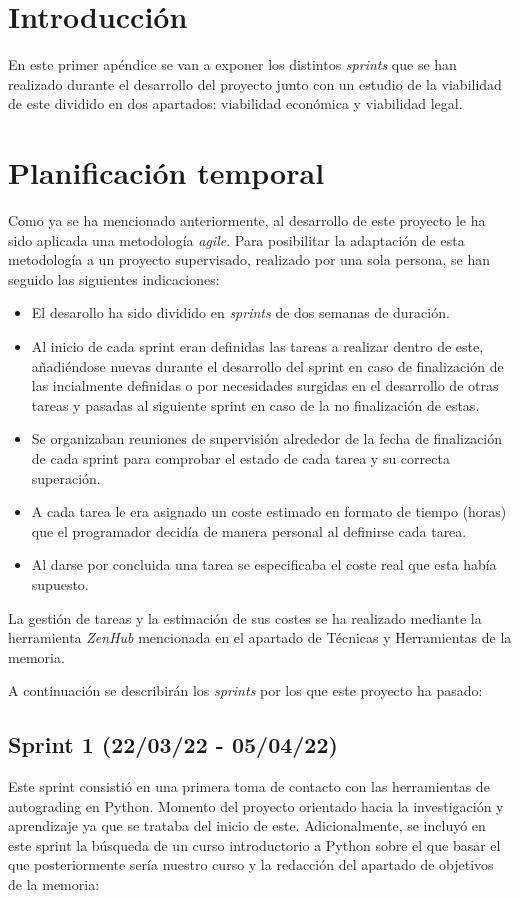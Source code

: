 
\section{Introducción}
En este primer apéndice se van a exponer los distintos \textit{sprints} que se han realizado durante el desarrollo del proyecto junto con un estudio de la viabilidad de este dividido en dos apartados: viabilidad económica y viabilidad legal.
\section{Planificación temporal}
Como ya se ha mencionado anteriormente, al desarrollo de este proyecto le ha sido aplicada una metodología \textit{agile}. Para posibilitar la adaptación de esta metodología a un proyecto supervisado, realizado por una sola persona, se han seguido las siguientes indicaciones:
\begin{itemize}
\item El desarollo ha sido dividido en \textit{sprints} de dos semanas de duración.
\item Al inicio de cada sprint eran definidas las tareas a realizar dentro de este, añadiéndose nuevas durante el desarrollo del sprint en caso de finalización de las incialmente definidas o por necesidades surgidas en el desarrollo de otras tareas y pasadas al siguiente sprint en caso de la no finalización de estas.
\item Se organizaban reuniones de supervisión alrededor de la fecha de finalización de cada sprint para comprobar el estado de cada tarea y su correcta superación.
\item A cada tarea le era asignado un coste estimado en formato de tiempo (horas) que el programador decidía de manera personal al definirse cada tarea.
\item Al darse por concluida una tarea se especificaba el coste real que esta había supuesto.
\end{itemize}
La gestión de tareas y la estimación de sus costes se ha realizado mediante la herramienta \textit{ZenHub}\cite{tool:ZenHub} mencionada en el apartado de Técnicas y Herramientas de la memoria.

A continuación se describirán los \textit{sprints} por los que este proyecto ha pasado:

\subsection{Sprint 1 (22/03/22 - 05/04/22)}
Este sprint consistió en una primera toma de contacto con las herramientas de autograding en Python\cite{tool:Python}. Momento del proyecto orientado hacia la investigación y aprendizaje ya que se trataba del inicio de este. Adicionalmente, se incluyó en este sprint la búsqueda de un curso\cite{PythonParaTodos} introductorio a Python sobre el que basar el que posteriormente sería nuestro curso y la redacción del apartado de objetivos de la memoria:

